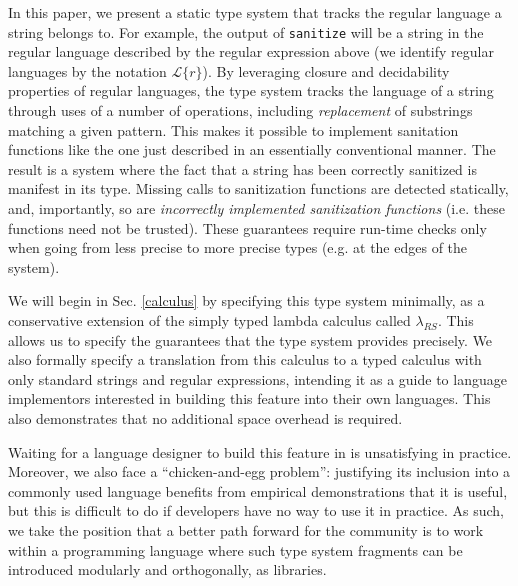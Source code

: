 \documentclass[9pt]{sig-alternate}
\theoremstyle{definition}
\newcommand{\lambdas}{\lambda_{RS}}
\begin{document}
In this paper, we present a static type system that tracks the regular language a string belongs to. For example, the output of \verb|sanitize| will be a string in the regular language described by the regular expression above (we identify regular languages by the notation $\mathcal{L}\{r\}$). By leveraging closure and decidability properties of regular languages, the type system tracks the language of a string through uses of a number of operations, including \emph{replacement} of substrings matching a given pattern. This makes it possible to implement sanitation functions like the one just described in an essentially conventional manner. The result is a system where the fact that a string has been {correctly} sanitized is manifest in its type. Missing calls to sanitization functions are detected statically, and, importantly, so are \emph{incorrectly implemented sanitization functions} (i.e. these functions need not be trusted). These guarantees require run-time checks only when going from less precise to more precise types (e.g. at the edges of the system). %

We will begin in Sec. \ref{calculus} by specifying this type system minimally, as a conservative extension of the simply typed lambda calculus called $\lambdas$. This allows us to specify the guarantees that the type system provides precisely. We also formally specify a translation from this calculus to a typed calculus with only standard strings and regular expressions, intending it as a guide to language implementors interested in building this feature into their own languages. This also demonstrates that no additional space overhead is required.

Waiting for a language designer to build this feature in is unsatisfying in practice. Moreover, we also face a ``chicken-and-egg problem'': justifying its inclusion into a commonly used language benefits from empirical demonstrations that it is useful, but this is difficult to do if developers have no way to use it in practice. As such, we take the position that a better path forward for the community is to work within a programming language where such type system fragments can be introduced modularly and orthogonally, as libraries. 
\end{document}
